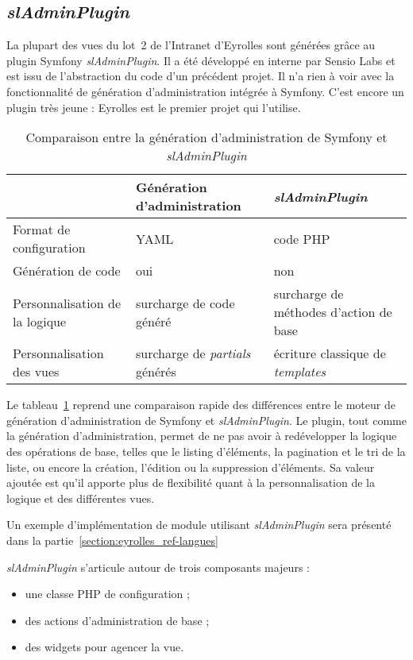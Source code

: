 \newpage
\subsection{\textit{slAdminPlugin}}

La plupart des vues du lot~2 de l'Intranet d'Eyrolles sont générées grâce au plugin Symfony \textit{slAdminPlugin}. Il a été développé en interne par Sensio Labs et est issu de l'abstraction du code d'un précédent projet. Il n'a rien à voir avec la fonctionnalité de génération d'administration intégrée à Symfony. C'est encore un plugin très jeune : Eyrolles est le premier projet qui l'utilise.

\begin{table}
	\centering
	\begin{tabular}{|p{3cm}||p{4.5cm}|p{4.5cm}|}
		\hline
		& Génération d'administration & \textit{slAdminPlugin} \tabularnewline
		\hline
		\hline
		Format de configuration & YAML & code PHP \tabularnewline
		\hline
		Génération de code & oui & non \tabularnewline
		\hline
		Personnalisation de la logique & surcharge de code généré & surcharge de méthodes d'action de base \tabularnewline
		\hline
		Personnalisation des vues & surcharge de \textit{partials} générés & écriture classique de \textit{templates} \tabularnewline
		\hline
	\end{tabular}
	\caption{Comparaison entre la génération d'administration de Symfony et \textit{slAdminPlugin}}
	\label{table:eyrolles_sladmin-vs-admin-gen}
\end{table}

Le tableau~\ref{table:eyrolles_sladmin-vs-admin-gen} reprend une comparaison rapide des différences entre le moteur de génération d'administration de Symfony et \textit{slAdminPlugin}. Le plugin, tout comme la génération d'administration, permet de ne pas avoir à redévelopper la logique des opérations de base, telles que le listing d'éléments, la pagination et le tri de la liste, ou encore la création, l'édition ou la suppression d'éléments. Sa valeur ajoutée est qu'il apporte plus de flexibilité quant à la personnalisation de la logique et des différentes vues.

Un exemple d'implémentation de module utilisant \textit{slAdminPlugin} sera présenté dans la partie~\ref{section:eyrolles_ref-langues}

\textit{slAdminPlugin} s'articule autour de trois composants majeurs :
\begin{itemize}
	\item une classe PHP de configuration ;
	\item des actions d'administration de base ;
	\item des widgets pour agencer la vue.
\end{itemize}

